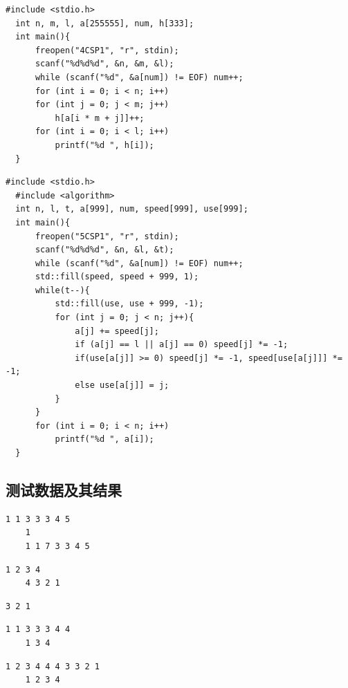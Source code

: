 \documentclass[a4paper,11pt,UTF8]{ctexart}
\begin{document}
\begin{lstlisting}[caption=4CSP.cpp,captionpos=b]
  #include <stdio.h>
  int n, m, l, a[255555], num, h[333];
  int main(){
      freopen("4CSP1", "r", stdin);
      scanf("%d%d%d", &n, &m, &l);
      while (scanf("%d", &a[num]) != EOF) num++;
      for (int i = 0; i < n; i++)
      for (int j = 0; j < m; j++)
          h[a[i * m + j]]++;
      for (int i = 0; i < l; i++)
          printf("%d ", h[i]);
  }
\end{lstlisting}

\begin{lstlisting}[caption=5CSP.cpp,captionpos=b]
  #include <stdio.h>
  #include <algorithm>
  int n, l, t, a[999], num, speed[999], use[999];
  int main(){
      freopen("5CSP1", "r", stdin);
      scanf("%d%d%d", &n, &l, &t);
      while (scanf("%d", &a[num]) != EOF) num++;
      std::fill(speed, speed + 999, 1);
      while(t--){
          std::fill(use, use + 999, -1);
          for (int j = 0; j < n; j++){
              a[j] += speed[j];
              if (a[j] == l || a[j] == 0) speed[j] *= -1;
              if(use[a[j]] >= 0) speed[j] *= -1, speed[use[a[j]]] *= -1;
              else use[a[j]] = j;
          }
      }
      for (int i = 0; i < n; i++)
          printf("%d ", a[i]);
  }
\end{lstlisting}

\subsection{测试数据及其结果}

\begin{lstlisting}[caption=1Linked\_list.cpp,captionpos=b]
    1 1 3 3 3 4 5
    1
    1 1 7 3 3 4 5
\end{lstlisting}

\begin{lstlisting}[caption=2Linked\_list\_Reverse.cpp,captionpos=b]
    1 2 3 4
    4 3 2 1
\end{lstlisting}

\begin{lstlisting}[caption=2Sequence\_list\_Reverse.cpp,captionpos=b]
    3 2 1
\end{lstlisting}

\begin{lstlisting}[caption=3Linked\_list\_Remove.cpp,captionpos=b]
    1 1 3 3 3 4 4
    1 3 4
\end{lstlisting}

\begin{lstlisting}[caption=3Sequence\_list\_Remove.cpp,captionpos=b]
    1 2 3 4 4 4 3 3 2 1
    1 2 3 4
\end{lstlisting}
\end{document}
